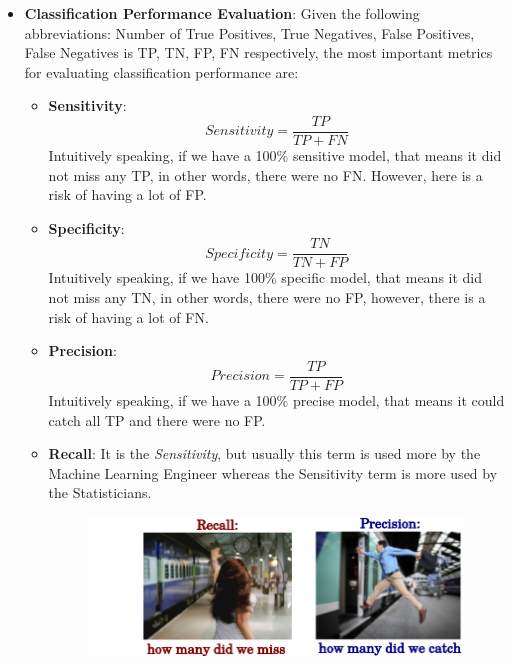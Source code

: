 \documentclass[11pt, twocolumn]{article}
\begin{document}
\begin{itemize}
\item \textbf{Classification Performance Evaluation}:
Given the following abbreviations:
Number of True Positives, True Negatives, False Positives, False Negatives is TP, TN, FP, FN respectively, the most important metrics for evaluating classification performance are:

\begin{itemize}
\item \textbf{Sensitivity}:
$$Sensitivity = \frac{TP}{TP + FN}$$
Intuitively speaking, if we have a 100\% sensitive model, that means it {\color{blue}did not} miss any {\color{blue}TP}, in other words, there were {\color{blue}no FN}. However, here is a risk of having a lot of {\color{red}FP}.

\item \textbf{Specificity}:
$$Specificity = \frac{TN}{TN + FP}$$
Intuitively speaking, if we have 100\% specific model, that means it {\color{blue}did not} miss any {\color{blue}TN}, in other words, there were {\color{blue}no FP}, however, there is a risk of having a lot of {\color{red}FN}.

\item \textbf{Precision}:
$$Precision = \frac{TP}{TP + FP}$$
Intuitively speaking, if we have a 100\% precise model, that means it {\color{blue}could catch all TP} and there were {\color{blue}no FP}.

\item \textbf{Recall}: It is the \textit{Sensitivity}, but usually this term is used more by the Machine Learning Engineer whereas the Sensitivity term is more used by the Statisticians.\\
\begin{figure}[h!]
  \centering
  \includegraphics[width=0.9\linewidth]{figs/f1_score.png}
\end{figure}


\end{itemize}
\end{itemize}
\end{document}

